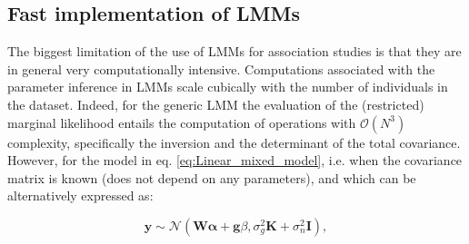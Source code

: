 

\subsection{Fast implementation of LMMs}
\label{sec:fast_lmm}

The biggest limitation of the use of LMMs for association studies is that they are in general very computationally intensive.
Computations associated with the parameter inference in LMMs scale cubically with
the number of individuals in the dataset. 
Indeed, for the generic LMM
the evaluation of the (restricted) marginal likelihood entails the computation of operations with $\mathcal{O}(N^3)$ complexity, specifically the inversion and the determinant of the total covariance. %
However, for the model in eq. \eqref{eq:Linear_mixed_model}, i.e. when the covariance matrix is known (does not depend on any parameters), and which can be alternatively expressed as:

\begin{equation}\label{eq:LMM_MVN}
 \mathbf{y} \sim  \mathcal{N}(\mathbf{W}\boldsymbol{\alpha} + \mathbf{g}\beta, \sigma_g^2\mathbf{K} + \sigma_n^2\mathbf{I}),
\end{equation}

